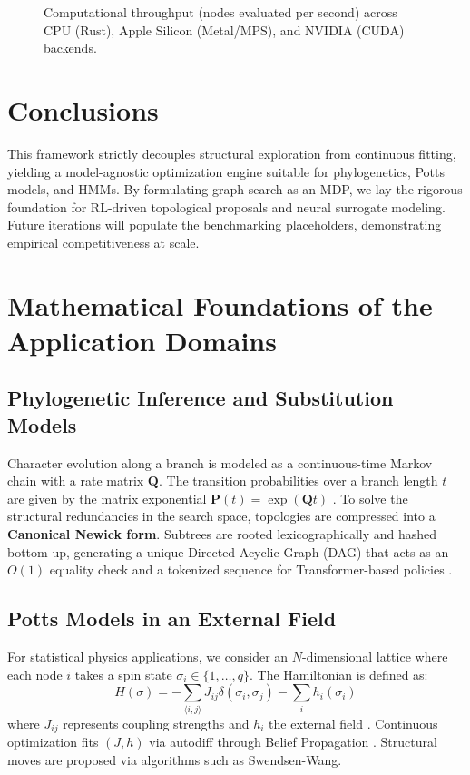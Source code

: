\documentclass[11pt,a4paper]{article}
\newcommand{\Q}{\mathbf{Q}}
\newcommand{\Pmat}{\mathbf{P}}
\begin{document}
\begin{figure}[htbp]
  \centering
  \caption{Computational throughput (nodes evaluated per second) across CPU (Rust), Apple Silicon (Metal/MPS), and NVIDIA (CUDA) backends.}
  \label{fig:hardware-scaling}
\end{figure}

\section{Conclusions}
\label{sec:conclusions}

This framework strictly decouples structural exploration from continuous fitting, yielding a model-agnostic optimization engine suitable for phylogenetics, Potts models, and HMMs. By formulating graph search as an MDP, we lay the rigorous foundation for RL-driven topological proposals and neural surrogate modeling. Future iterations will populate the benchmarking placeholders, demonstrating empirical competitiveness at scale.




\appendix

\section{Mathematical Foundations of the Application Domains}
\label{app:background}

\subsection{Phylogenetic Inference and Substitution Models}
Character evolution along a branch is modeled as a continuous-time Markov chain with a rate matrix $\Q$. The transition probabilities over a branch length $t$ are given by the matrix exponential $\Pmat(t) = \exp(\Q t)$ \citep{felsenstein2004}. 
To solve the structural redundancies in the search space, topologies are compressed into a \textbf{Canonical Newick form}. Subtrees are rooted lexicographically and hashed bottom-up, generating a unique Directed Acyclic Graph (DAG) that acts as an $O(1)$ equality check and a tokenized sequence for Transformer-based policies \citep{raschka2024}.

\subsection{Potts Models in an External Field}
For statistical physics applications, we consider an $N$-dimensional lattice where each node $i$ takes a spin state $\sigma_i \in \{1, \dots, q\}$. The Hamiltonian is defined as:
\begin{equation}
    H(\sigma) = - \sum_{\langle i,j \rangle} J_{ij} \delta(\sigma_i, \sigma_j) - \sum_i h_i(\sigma_i)
\end{equation}
where $J_{ij}$ represents coupling strengths and $h_i$ the external field \citep{mezard2009}. Continuous optimization fits $(J, h)$ via autodiff through Belief Propagation \citep{koller2009}. Structural moves are proposed via algorithms such as Swendsen-Wang.
\end{document}
